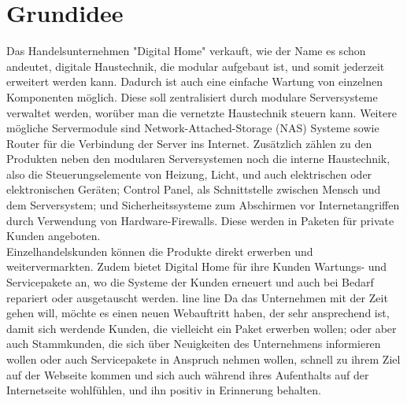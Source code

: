 \section{Grundidee}

Das Handelsunternehmen "Digital Home" verkauft, wie der Name es schon andeutet, digitale Haustechnik, die modular aufgebaut ist, und somit jederzeit erweitert werden kann. Dadurch ist auch eine einfache Wartung von einzelnen Komponenten möglich. Diese soll zentralisiert durch modulare Serversysteme verwaltet werden, worüber man die vernetzte Haustechnik steuern kann. Weitere mögliche Servermodule sind Network-Attached-Storage (NAS) Systeme sowie Router für die Verbindung der Server ins Internet. Zusätzlich zählen zu den Produkten neben den modularen Serversystemen noch die interne Haustechnik, also die Steuerungselemente von Heizung, Licht, und auch elektrischen oder elektronischen Geräten; Control Panel, als Schnittstelle zwischen Mensch und dem Serversystem; und Sicherheitssysteme zum Abschirmen vor Internetangriffen durch Verwendung von Hardware-Firewalls. Diese werden in Paketen für private Kunden angeboten.  
\\
Einzelhandelskunden können die Produkte direkt erwerben und weitervermarkten. Zudem bietet Digital Home für ihre Kunden Wartungs- und Servicepakete an, wo die Systeme der Kunden erneuert und auch bei Bedarf repariert oder ausgetauscht werden.
\new line
\new line
Da das Unternehmen mit der Zeit gehen will, möchte es einen neuen Webauftritt haben, der sehr ansprechend ist, damit sich werdende Kunden, die vielleicht ein Paket erwerben wollen; oder aber auch Stammkunden, die sich über Neuigkeiten des Unternehmens informieren wollen oder auch Servicepakete in Anspruch nehmen wollen, schnell zu ihrem Ziel auf der Webseite kommen und sich auch während ihres Aufenthalts auf der Internetseite wohlfühlen, und ihn positiv in Erinnerung behalten.

